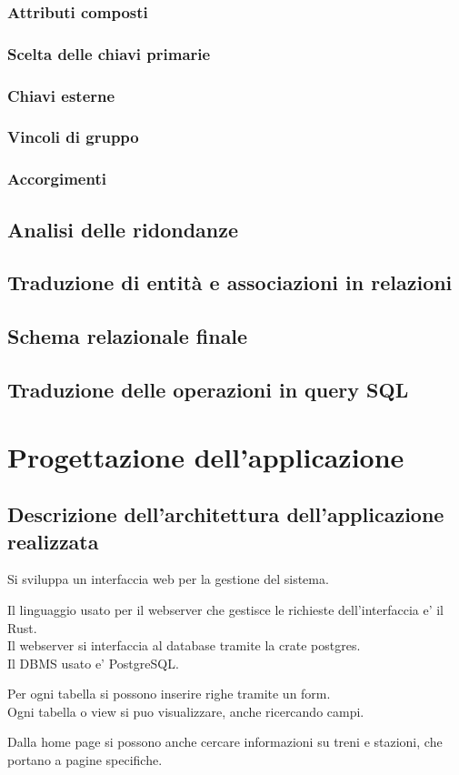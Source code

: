 \documentclass[a4paper,12pt]{report}
\begin{document}
	\subsection{Attributi composti}
	\subsection{Scelta delle chiavi primarie}
	\subsection{Chiavi esterne}
	\subsection{Vincoli di gruppo}
	\subsection{Accorgimenti}
	\section{Analisi delle ridondanze}
	\section{Traduzione di entità e associazioni in relazioni}
	\section{Schema relazionale finale}
	\section{Traduzione delle operazioni in query SQL}
	\chapter{Progettazione dell'applicazione}
	
	\section{Descrizione dell'architettura dell'applicazione realizzata}
	\par Si sviluppa un interfaccia web per la gestione del sistema.
	\par Il linguaggio usato per il webserver che gestisce le richieste dell'interfaccia e' il Rust.
	\\Il webserver si interfaccia al database tramite la crate postgres.
	\\Il DBMS usato e' PostgreSQL.
	\par Per ogni tabella si possono inserire righe tramite un form.
	\\Ogni tabella o view si puo visualizzare, anche ricercando campi.
	\par Dalla home page si possono anche cercare informazioni su treni e stazioni, che portano a pagine specifiche.
\end{document}
